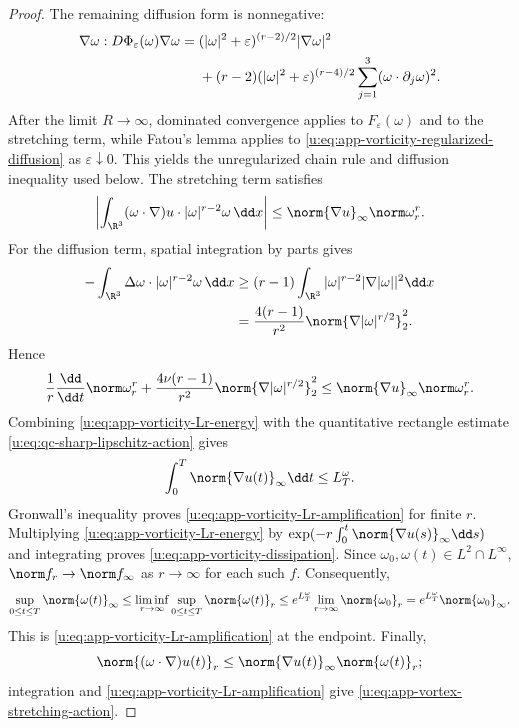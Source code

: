 \begin{proof}
The remaining diffusion form is nonnegative:
\begin{align}
 \nabla\omega:D\Phi_\varepsilon(\omega)\nabla\omega
 ={}&(|\omega|^2+\varepsilon)^{(r-2)/2}|\nabla\omega|^2
 \notag\\
 &+(r-2)(|\omega|^2+\varepsilon)^{(r-4)/2}
 \sum_{j=1}^3(\omega\cdot\partial_j\omega)^2.
 \label{u:eq:app-vorticity-regularized-diffusion}
\end{align}
After the limit \(R\to\infty\), dominated convergence applies to
\(F_\varepsilon(\omega)\) and to the stretching term, while Fatou's lemma
applies to \eqref{u:eq:app-vorticity-regularized-diffusion} as
\(\varepsilon\downarrow0\).  This yields the unregularized chain rule and
diffusion inequality used below.  The stretching term
satisfies
\[
 \left|\int_{\R^3}(\omega\cdot\nabla)u\cdot
       |\omega|^{r-2}\omega\,\dd x\right|
 \le\norm{\nabla u}_\infty\norm\omega_r^r.
\]
For the diffusion term, spatial integration by parts gives
\begin{align*}
 -\int_{\R^3}\Delta\omega\cdot|\omega|^{r-2}\omega\,\dd x
 &\ge(r-1)\int_{\R^3}|\omega|^{r-2}|\nabla|\omega||^2\dd x\\
 &=\frac{4(r-1)}{r^2}
   \norm{\nabla|\omega|^{r/2}}_2^2.
\end{align*}
Hence
\begin{equation}
 \frac1r\frac{\dd}{\dd t}\norm\omega_r^r
 +\frac{4\nu(r-1)}{r^2}
   \norm{\nabla|\omega|^{r/2}}_2^2
 \le\norm{\nabla u}_\infty\norm\omega_r^r.
 \label{u:eq:app-vorticity-Lr-energy}
\end{equation}
Combining \eqref{u:eq:app-vorticity-Lr-energy} with the quantitative rectangle
estimate \eqref{u:eq:qc-sharp-lipschitz-action} gives
\[
 \int_0^T\norm{\nabla u(t)}_\infty\dd t\le L_T^\omega.
\]
Gronwall's inequality proves
\eqref{u:eq:app-vorticity-Lr-amplification} for finite \(r\).  Multiplying
\eqref{u:eq:app-vorticity-Lr-energy} by
\(
 \exp(-r\int_0^t\norm{\nabla u(s)}_\infty\dd s)
\)
and integrating proves \eqref{u:eq:app-vorticity-dissipation}.  Since
\(\omega_0,\omega(t)\in L^2\cap L^\infty\),
\(\norm f_r\to\norm f_\infty\) as \(r\to\infty\) for each such \(f\).
Consequently,
\[
 \sup_{0\le t\le T}\norm{\omega(t)}_\infty
 \le\liminf_{r\to\infty}
      \sup_{0\le t\le T}\norm{\omega(t)}_r
 \le e^{L_T^\omega}\lim_{r\to\infty}\norm{\omega_0}_r
 =e^{L_T^\omega}\norm{\omega_0}_\infty.
\]
This is \eqref{u:eq:app-vorticity-Lr-amplification} at the endpoint.  Finally,
\[
 \norm{(\omega\cdot\nabla)u(t)}_r
 \le\norm{\nabla u(t)}_\infty\norm{\omega(t)}_r;
\]
integration and \eqref{u:eq:app-vorticity-Lr-amplification} give
\eqref{u:eq:app-vortex-stretching-action}.
\end{proof}

